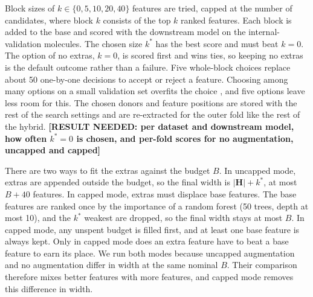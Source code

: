 Block sizes of $k \in \{0, 5, 10, 20, 40\}$ features are tried, capped at the number of candidates, where block $k$ consists of the top $k$ ranked features. Each block is added to the base and scored with the downstream model on the internal-validation molecules. The chosen size $k^*$ has the best score and must beat $k=0$. The option of no extras, $k=0$, is scored first and wins ties, so keeping no extras is the default outcome rather than a failure. Five whole-block choices replace about 50 one-by-one decisions to accept or reject a feature. Choosing among many options on a small validation set overfits the choice \citep{Cawley2010}, and five options leave less room for this. The chosen donors and feature positions are stored with the rest of the search settings and are re-extracted for the outer fold like the rest of the hybrid. \textbf{[RESULT NEEDED: per dataset and downstream model, how often $k^*=0$ is chosen, and per-fold scores for no augmentation, uncapped and capped]}

There are two ways to fit the extras against the budget $B$. In uncapped mode, extras are appended outside the budget, so the final width is $|\mathbf{H}| + k^*$, at most $B + 40$ features. In capped mode, extras must displace base features. The base features are ranked once by the importance of a random forest (50 trees, depth at most 10), and the $k^*$ weakest are dropped, so the final width stays at most $B$. In capped mode, any unspent budget is filled first, and at least one base feature is always kept. Only in capped mode does an extra feature have to beat a base feature to earn its place. We run both modes because uncapped augmentation and no augmentation differ in width at the same nominal $B$. Their comparison therefore mixes better features with more features, and capped mode removes this difference in width.

